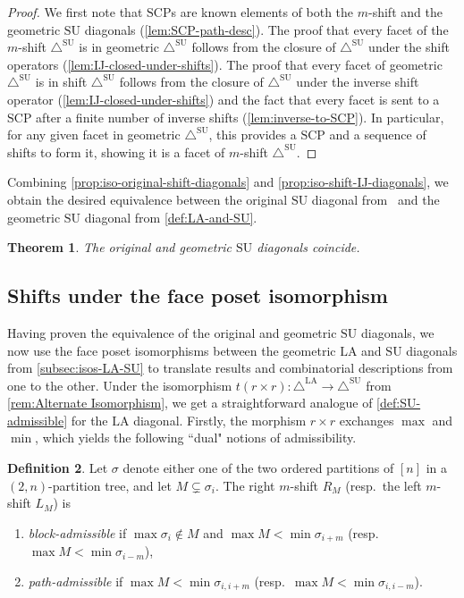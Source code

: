 \documentclass{amsart}
\newcommand{\darkblue}{\color{darkblue}} %
\newtheorem{theorem}{Theorem}[section]
\theoremstyle{definition}
\newtheorem{definition}[theorem]{Definition}
\newcommand{\resp}{resp.~} %
\newcommand{\defn}[1]{\textsl{\darkblue #1}} %
\newcommand{\SU}{\mathrm{SU}}
\newcommand{\LA}{\mathrm{LA}}
\newcommand{\SUD}{\triangle^{\mathrm{SU}}}
\newcommand{\LAD}{\triangle^{\mathrm{LA}}}
\newcommand{\SCP}{\mathrm{SCP}}
\begin{document}
\begin{proof}
We first note that $\SCP$s are known elements of both the $m$-shift and the geometric $\SU$ diagonals (\cref{lem:SCP-path-desc}).
The proof that every facet of the $m$-shift $\SUD$ is in geometric $\SUD$ follows from the closure of $\SUD$ under the shift operators (\cref{lem:IJ-closed-under-shifts}).
The proof that every facet of geometric $\SUD$ is in shift $\SUD$ follows from the closure of $\SUD$ under the inverse shift operator (\cref{lem:IJ-closed-under-shifts}) and the fact that every facet is sent to a $\SCP$ after a finite number of inverse shifts (\cref{lem:inverse-to-SCP}).
In particular, for any given facet in geometric $\SUD$, this provides a $\SCP$ and a sequence of shifts to form it, showing it is a facet of $m$-shift $\SUD$.
\end{proof}

Combining \cref{prop:iso-original-shift-diagonals} and \cref{prop:iso-shift-IJ-diagonals}, we obtain the desired equivalence between the original $\SU$ diagonal from~\cite{SaneblidzeUmble} and the geometric $\SU$ diagonal from \cref{def:LA-and-SU}.

\begin{theorem}
\label{thm:recover-SU}
The original and geometric $\SU$ diagonals coincide.
\end{theorem}


\subsection{Shifts under the face poset isomorphism}
\label{subsec:shifts-under-iso}

Having proven the equivalence of the original and geometric $\SU$ diagonals, we now use the face poset isomorphisms between the geometric $\LA$ and $\SU$ diagonals from \cref{subsec:isos-LA-SU} to translate results and combinatorial descriptions from one to the other. 
Under the isomorphism $t(r\times r):\LAD\to\SUD$ from \cref{rem:Alternate Isomorphism}, we get a straightforward analogue of \cref{def:SU-admissible} for the $\LA$ diagonal.
Firstly, the morphism $r \times r$ exchanges $\max$ and $\min$, which yields the following ``dual" notions of admissibility.

\begin{definition}
\label{def:LA-admissible}
Let $\sigma$ denote either one of the two ordered partitions of $[n]$ in a $(2,n)$-partition tree, and let $M \subsetneq \sigma_i$.
The right $m$-shift $R_{M}$ (\resp the left $m$-shift $L_{M}$) is 
\begin{enumerate}
\item \defn{block-admissible} if $\max \sigma_i \notin M$ and $\max M < \min \sigma_{i+m}$ (\resp $\max M < \min \sigma_{i-m}$),
\item \defn{path-admissible} if $\max M< \min \sigma_{i,i+m}$ (\resp $\max M < \min \sigma_{i,i-m}$).
\end{enumerate}
\end{definition}
\end{document}
